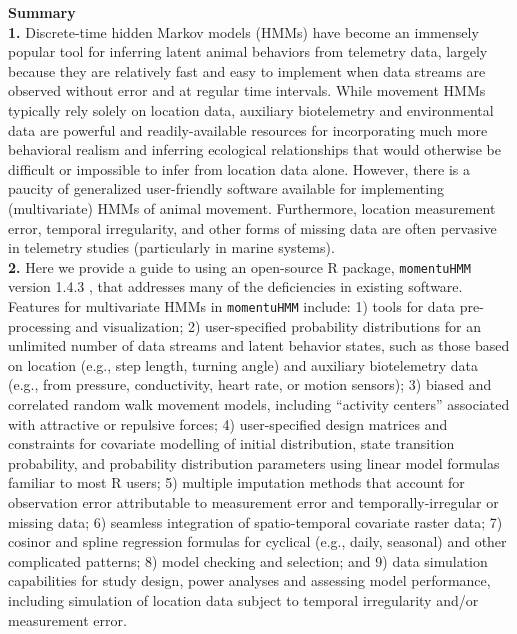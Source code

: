 \documentclass[12pt]{article}\usepackage[]{graphicx}\usepackage[]{color}
\begin{document}
\noindent \textbf{Summary}\\
\textbf{1.} Discrete-time hidden Markov models (HMMs) have become an immensely popular tool for inferring latent animal behaviors from telemetry data, largely because they are relatively fast and easy to implement when data streams are observed without error and at regular time intervals. While movement HMMs typically rely solely on location data, auxiliary biotelemetry and environmental data are powerful and readily-available resources for incorporating much more behavioral realism and inferring ecological relationships that would otherwise be difficult or impossible to infer from location data alone.  However, there is a paucity of generalized user-friendly software available for implementing (multivariate) HMMs of animal movement. Furthermore, location measurement error, temporal irregularity, and other forms of missing data are often pervasive in telemetry studies (particularly in marine systems).\\ %
\textbf{2.} Here we provide a guide to using an open-source R package, \verb|momentuHMM| version 1.4.3%
, that addresses many of the deficiencies in existing software.  Features for multivariate HMMs in \verb|momentuHMM| include: 1) tools for data pre-processing and visualization; 2) user-specified probability distributions for an unlimited number of data streams and latent behavior states, such as those based on location (e.g., step length, turning angle) and auxiliary biotelemetry data (e.g., from pressure, conductivity, heart rate, or motion sensors); 3) biased and correlated random walk movement models, including ``activity centers'' associated with attractive or repulsive forces; 4) user-specified design matrices and constraints for covariate modelling of initial distribution, state transition probability, and probability distribution parameters using linear model formulas familiar to most R users; 5) multiple imputation methods that account for observation error attributable to measurement error and temporally-irregular or missing data; 6) seamless integration of spatio-temporal covariate raster data; 7) cosinor and spline regression formulas for cyclical (e.g., daily, seasonal) and other complicated patterns; 8) model checking and selection; and 9) data simulation capabilities for study design, power analyses and assessing model performance, including simulation of location data subject to temporal irregularity and/or measurement error.\\ 
\end{document}
